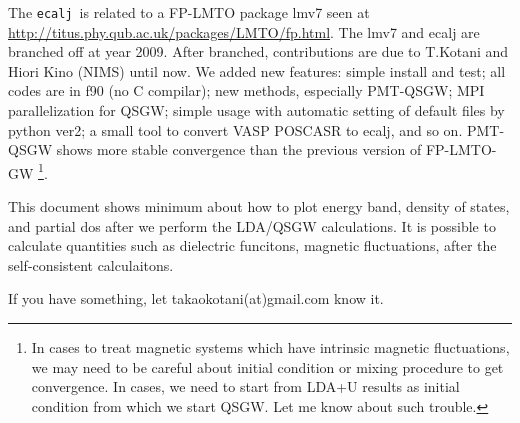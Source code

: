 \documentclass[a4paper,10pt,epsf,fleqn]{article}
\def\ecalj{\texttt{ecalj}}
\begin{document}
The \ecalj\ is related to a FP-LMTO package lmv7 seen at\\
\url{http://titus.phy.qub.ac.uk/packages/LMTO/fp.html}. 
The lmv7 and ecalj are branched off at year 2009.
After branched, contributions are 
due to T.Kotani and Hiori Kino (NIMS) until now. 
We added new features: simple install and test;
all codes are in f90 (no C compilar);
new methods, especially PMT-QSGW; 
MPI parallelization for QSGW;
simple usage with automatic setting of default files by python ver2;
a small tool to convert VASP POSCASR to ecalj, and so on.
PMT-QSGW shows more stable convergence than the previous version of FP-LMTO-GW
\footnote{In cases to treat magnetic
systems which have intrinsic magnetic fluctuations, 
we may need to be careful about initial condition or mixing procedure
to get convergence. In cases, we need to start from LDA+U results as initial
condition from which we start QSGW. Let me know about such trouble.}.

This document shows minimum about how to plot energy band,
density of states, and partial dos after we perform the LDA/QSGW
calculations.
It is possible to calculate quantities such as dielectric funcitons, 
magnetic fluctuations, after the self-consistent calculaitons.

If you have something, let takaokotani(at)gmail.com know it.
\end{document}
